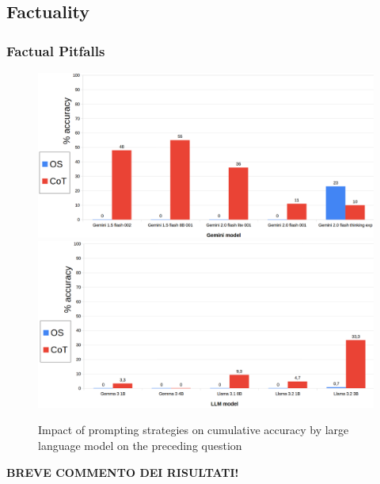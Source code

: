 \documentclass[12pt]{article}
\begin{document}
\vspace{1cm}
\subsection{Factuality}
\subsubsection{Factual Pitfalls} %

\begin{figure}[H]
    \centering
            \includegraphics[width=1\textwidth]{q201Gemini.png}
            \includegraphics[width=1\textwidth]{q201Other.png}
    \caption[Accuracy on Question 7 by LLM]{Impact of prompting strategies on cumulative accuracy by large language model on the preceding question}
    \end{figure} 
\textbf{BREVE COMMENTO DEI RISULTATI!}

\vspace{1cm}

\end{document}
